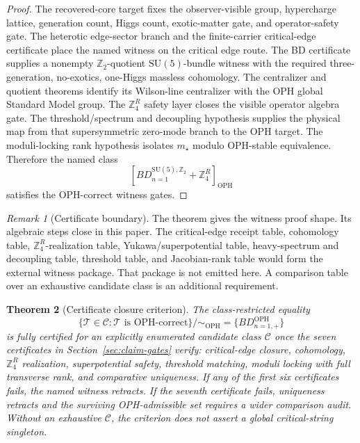 \documentclass[11pt]{article}
\newtheorem{theorem}{Theorem}[section]
\theoremstyle{remark}
\newtheorem{remark}[theorem]{Remark}
\theoremstyle{plain}
\newcommand{\OPH}{\mathrm{OPH}}
\newcommand{\SU}{\mathrm{SU}}
\newcommand{\Z}{\mathbb Z}
\newcommand{\ZfourR}{\mathbb Z_4^R}
\newcommand{\Teq}{\sim_{\OPH}}
\begin{document}
\begin{proof}
The recovered-core target fixes the observer-visible group, hypercharge lattice, generation
count, Higgs count, exotic-matter gate, and operator-safety gate. The heterotic edge-sector branch
and the finite-carrier critical-edge certificate place the named witness on the critical edge
route. The BD certificate supplies a nonempty \(\Z_2\)-quotient \(\SU(5)\)-bundle witness with the
required three-generation, no-exotics, one-Higgs massless cohomology. The centralizer and quotient theorems identify
its Wilson-line centralizer with the OPH global Standard Model group. The \(\ZfourR\) safety
layer closes the visible operator algebra gate. The threshold/spectrum and decoupling hypothesis
supplies the physical map from that supersymmetric zero-mode branch to the OPH target. The
moduli-locking rank hypothesis isolates
\(m_\star\) modulo OPH-stable equivalence. Therefore the named class
\[
\left[
BD_{n=1}^{\SU(5),\Z_2}+\ZfourR
\right]_{\OPH}
\]
satisfies the OPH-correct witness gates.
\end{proof}

\begin{remark}[Certificate boundary]
The theorem gives the witness proof shape. Its algebraic steps close in this paper. The critical-edge
receipt table, cohomology table, \(\ZfourR\)-realization table, Yukawa/superpotential table,
heavy-spectrum and decoupling table, threshold table, and Jacobian-rank table would form the
external witness package. That package is not emitted here. A comparison table over an exhaustive
candidate class is an additional requirement.
\end{remark}

\begin{theorem}[Certificate closure criterion]
The class-restricted equality
\[
\{\mathcal T\in\mathcal C:\mathcal T\text{ is OPH-correct}\}/\Teq=\{BD_{n=1,+}^{\OPH}\}
\]
is fully certified for an explicitly enumerated candidate class \(\mathcal C\) once the seven
certificates in Section~\ref{sec:claim-gates}
verify: critical-edge closure, cohomology, \(\ZfourR\) realization, superpotential
safety, threshold matching, moduli locking with full transverse rank, and comparative uniqueness.
If any of the first six
certificates fails, the named witness retracts. If the seventh certificate fails, uniqueness
retracts and the surviving OPH-admissible set requires a wider comparison audit. Without an
exhaustive \(\mathcal C\), the criterion does not assert a global critical-string singleton.
\end{theorem}
\end{document}
